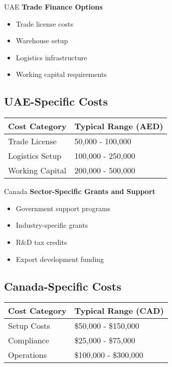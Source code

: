 \begin{regionalbox}{UAE}
\textbf{Trade Finance Options}
\begin{itemize}
    \item Trade license costs
    \item Warehouse setup
    \item Logistics infrastructure
    \item Working capital requirements
\end{itemize}

\subsection{UAE-Specific Costs}
\begin{center}
\begin{tabular}{p{}|p{}}
    \textbf{Cost Category} & \textbf{Typical Range (AED)} \\
    \hline
    Trade License & 50,000 - 100,000 \\
    Logistics Setup & 100,000 - 250,000 \\
    Working Capital & 200,000 - 500,000 \\
\end{tabular}
\end{center}
\end{regionalbox}

\begin{regionalbox}{Canada}
\textbf{Sector-Specific Grants and Support}
\begin{itemize}
    \item Government support programs
    \item Industry-specific grants
    \item R\&D tax credits
    \item Export development funding
\end{itemize}

\subsection{Canada-Specific Costs}
\begin{center}
\begin{tabular}{p{}|p{}}
    \textbf{Cost Category} & \textbf{Typical Range (CAD)} \\
    \hline
    Setup Costs & \$50,000 - \$150,000 \\
    Compliance & \$25,000 - \$75,000 \\
    Operations & \$100,000 - \$300,000 \\
\end{tabular}
\end{center}
\end{regionalbox}

